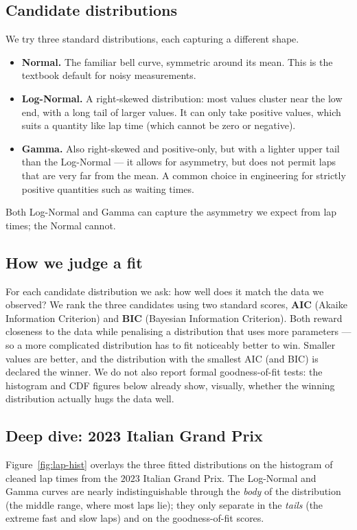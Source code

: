 \documentclass[11pt,a4paper]{article}
\theoremstyle{remark}
\begin{document}
\subsection{Candidate distributions}
We try three standard distributions, each capturing a different
shape.
\begin{itemize}
  \item \textbf{Normal.} The familiar bell curve, symmetric around
  its mean. This is the textbook default for noisy measurements.
  \item \textbf{Log-Normal.} A right-skewed distribution: most
  values cluster near the low end, with a long tail of larger
  values. It can only take positive values, which suits a quantity
  like lap time (which cannot be zero or negative).
  \item \textbf{Gamma.} Also right-skewed and positive-only, but
  with a lighter upper tail than the Log-Normal --- it allows for
  asymmetry, but does not permit laps that are very far from the
  mean. A common choice in engineering for strictly positive
  quantities such as waiting times.
\end{itemize}
Both Log-Normal and Gamma can capture the asymmetry we expect from
lap times; the Normal cannot.

\subsection{How we judge a fit}
For each candidate distribution we ask: how well does it match the
data we observed? We rank the three candidates using two standard
scores, \textbf{AIC} (Akaike Information Criterion) and \textbf{BIC}
(Bayesian Information Criterion). Both reward closeness to the data
while penalising a distribution that uses more parameters --- so a
more complicated distribution has to fit noticeably better to win.
Smaller values are better, and the distribution with the smallest
AIC (and BIC) is declared the winner. We do not also report formal
goodness-of-fit tests: the histogram and CDF figures below already
show, visually, whether the winning distribution actually hugs the
data well.

\subsection{Deep dive: 2023 Italian Grand Prix}
Figure~\ref{fig:lap-hist} overlays the three fitted distributions
on the histogram of cleaned lap times from the $2023$ Italian Grand
Prix. The Log-Normal and Gamma curves are nearly indistinguishable
through the \emph{body} of the distribution (the middle range,
where most laps lie); they only separate in the \emph{tails} (the
extreme fast and slow laps) and on the goodness-of-fit scores.
\end{document}
